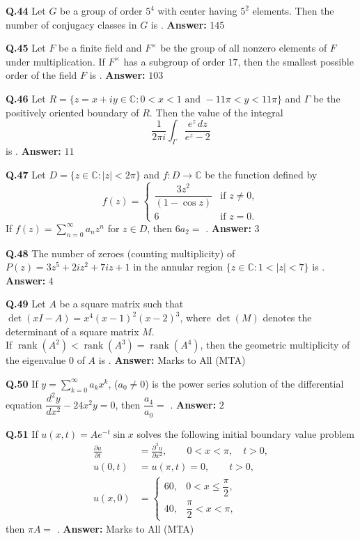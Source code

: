 \documentclass[11pt,a4paper]{article}
\newcommand{\ans}[1]{\textbf{Answer:} #1\par\medskip}
\begin{document}
\textbf{Q.44} Let $G$ be a group of order $5^4$ with center having $5^2$ elements. Then the number of conjugacy classes in $G$ is \underline{\hspace{2cm}}.
\ans{$145$}

\textbf{Q.45} Let $F$ be a finite field and $F^\times$ be the group of all nonzero elements of $F$ under multiplication. If $F^\times$ has a subgroup of order $17$, then the smallest possible order of the field $F$ is \underline{\hspace{2cm}}.
\ans{$103$}

\textbf{Q.46} Let $R = \{z = x + iy \in \mathbb{C} : 0 < x < 1 \text{ and } -11\pi < y < 11\pi\}$ and $\Gamma$ be the positively oriented boundary of $R$. Then the value of the integral
\[
  \frac{1}{2\pi i} \int_\Gamma \frac{e^z\,dz}{e^z - 2}
\]
is \underline{\hspace{2cm}}.
\ans{$11$}

\textbf{Q.47} Let $D = \{z \in \mathbb{C} : |z| < 2\pi\}$ and $f : D \to \mathbb{C}$ be the function defined by
\[
  f(z) = \begin{cases}
    \dfrac{3z^2}{(1 - \cos z)} & \text{if } z \neq 0, \\[6pt]
    6 & \text{if } z = 0.
  \end{cases}
\]
If $f(z) = \sum_{n=0}^{\infty} a_n z^n$ for $z \in D$, then $6 a_2 =$ \underline{\hspace{2cm}}.
\ans{$3$}

\textbf{Q.48} The number of zeroes (counting multiplicity) of $P(z) = 3z^5 + 2i z^2 + 7i z + 1$ in the annular region $\{z \in \mathbb{C} : 1 < |z| < 7\}$ is \underline{\hspace{2cm}}.
\ans{$4$}

\textbf{Q.49} Let $A$ be a square matrix such that $\det(xI - A) = x^4 (x - 1)^2 (x - 2)^3$, where $\det(M)$ denotes the determinant of a square matrix $M$.\\
If $\operatorname{rank}(A^2) < \operatorname{rank}(A^3) = \operatorname{rank}(A^4)$, then the geometric multiplicity of the eigenvalue $0$ of $A$ is \underline{\hspace{2cm}}.
\ans{Marks to All (MTA)}

\textbf{Q.50} If $y = \sum_{k=0}^{\infty} a_k x^k$, ($a_0 \neq 0$) is the power series solution of the differential equation $\dfrac{d^2 y}{dx^2} - 24x^2 y = 0$, then $\dfrac{a_4}{a_0} =$ \underline{\hspace{2cm}}.
\ans{$2$}

\textbf{Q.51} If $u(x, t) = A e^{-t} \sin x$ solves the following initial boundary value problem
\begin{align*}
  \frac{\partial u}{\partial t} &= \frac{\partial^2 u}{\partial x^2}, \qquad 0 < x < \pi,\quad t > 0, \\
  u(0, t) &= u(\pi, t) = 0, \qquad t > 0, \\
  u(x, 0) &= \begin{cases} 60, & 0 < x \le \dfrac{\pi}{2}, \\[6pt] 40, & \dfrac{\pi}{2} < x < \pi, \end{cases}
\end{align*}
then $\pi A =$ \underline{\hspace{2cm}}.
\ans{Marks to All (MTA)}
\end{document}

